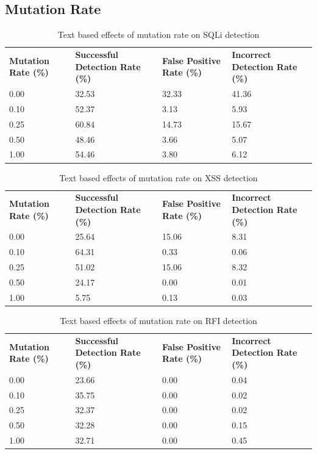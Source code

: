 \begin{appendices}
\newpage
\subsection{Mutation Rate}

\begin{table}[h]
	\centering
	\begin{tabular}{|p{1.5in}|p{1in}|p{1in}|p{1in}|}
	\hline
	\textbf{Mutation Rate (\%)} & \textbf{Successful Detection Rate (\%)} & \textbf{False Positive Rate (\%)} & \textbf{Incorrect Detection Rate (\%)}  \\
	\hhline{|=|=|=|=|}
	0.00 & 32.53 & 32.33 & 41.36 \\
	\hline
	0.10 & 52.37 & 3.13 & 5.93 \\
	\hline
	0.25 & 60.84 & 14.73 & 15.67 \\
	\hline
	0.50 & 48.46 & 3.66 & 5.07 \\
	\hline
	1.00 & 54.46 & 3.80 & 6.12 \\
	\hline
	\end{tabular}
	\caption{Text based effects of mutation rate on SQLi detection}
\end{table}

\begin{table}[h]
	\centering
	\begin{tabular}{|p{1.5in}|p{1in}|p{1in}|p{1in}|}
	\hline
	\textbf{Mutation Rate (\%)} & \textbf{Successful Detection Rate (\%)} & \textbf{False Positive Rate (\%)} & \textbf{Incorrect Detection Rate (\%)}  \\
	\hhline{|=|=|=|=|}
	0.00 & 25.64 & 15.06 & 8.31 \\
	\hline
	0.10 & 64.31 & 0.33 & 0.06 \\
	\hline
	0.25 & 51.02 & 15.06 & 8.32 \\
	\hline
	0.50 & 24.17 & 0.00 & 0.01 \\
	\hline
	1.00 & 5.75 & 0.13 & 0.03 \\
	\hline
	\end{tabular}
	\caption{Text based effects of mutation rate on XSS detection}
\end{table}

\begin{table}[h]
	\centering
	\begin{tabular}{|p{1.5in}|p{1in}|p{1in}|p{1in}|}
	\hline
	\textbf{Mutation Rate (\%)} & \textbf{Successful Detection Rate (\%)} & \textbf{False Positive Rate (\%)} & \textbf{Incorrect Detection Rate (\%)}  \\
	\hhline{|=|=|=|=|}
	0.00 & 23.66 & 0.00 & 0.04 \\
	\hline
	0.10 & 35.75 & 0.00 & 0.02 \\
	\hline
	0.25 & 32.37 & 0.00 & 0.02 \\
	\hline
	0.50 & 32.28 & 0.00 & 0.15 \\
	\hline
	1.00 & 32.71 & 0.00 & 0.45 \\
	\hline
	\end{tabular}
	\caption{Text based effects of mutation rate on RFI detection}
\end{table}


\end{appendices}
